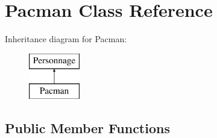 \hypertarget{class_pacman}{}\section{Pacman Class Reference}
\label{class_pacman}
Inheritance diagram for Pacman\+:\begin{figure}[H]
\begin{center}
\leavevmode
\includegraphics[height=2.000000cm]{class_pacman}
\end{center}
\end{figure}
\subsection*{Public Member Functions}
